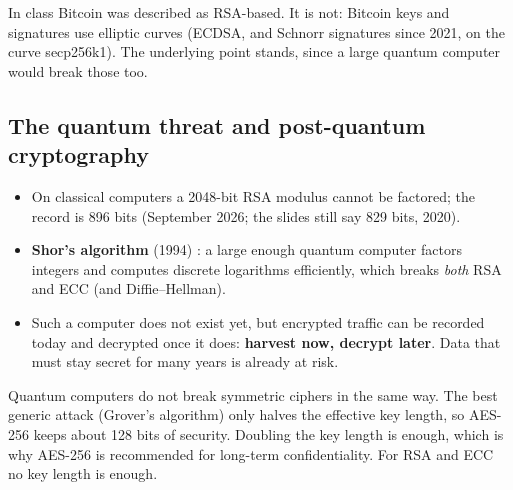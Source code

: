 \begin{remark}
In class Bitcoin was described as RSA-based. It is not: Bitcoin keys and signatures use elliptic curves (ECDSA, and Schnorr signatures since 2021, on the curve secp256k1). The underlying point stands, since a large quantum computer would break those too.
\end{remark}

\subsection{The quantum threat and post-quantum cryptography}

\begin{itemize}
    \item On classical computers a 2048-bit RSA modulus cannot be factored; the record is 896 bits (September 2026; the slides still say 829 bits, 2020).
    \item \textbf{Shor's algorithm} (1994) \cite{shor1997}: a large enough quantum computer factors integers and computes discrete logarithms efficiently, which breaks \emph{both} RSA and ECC (and Diffie--Hellman).
    \item Such a computer does not exist yet, but encrypted traffic can be recorded today and decrypted once it does: \textbf{harvest now, decrypt later}. Data that must stay secret for many years is already at risk.
\end{itemize}

\begin{remark}
Quantum computers do not break symmetric ciphers in the same way. The best generic attack (Grover's algorithm) only halves the effective key length, so AES-256 keeps about 128 bits of security. Doubling the key length is enough, which is why AES-256 is recommended for long-term confidentiality. For RSA and ECC no key length is enough.
\end{remark}

